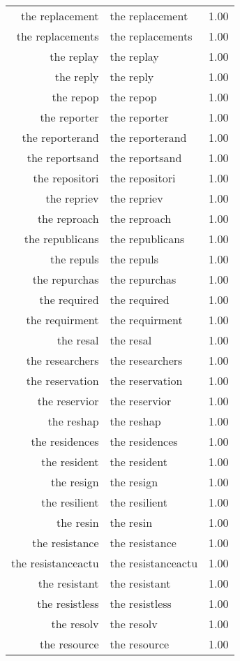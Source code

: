 \begin{table}[ht]
\begin{tabular}{rlr}
  the replacement & the replacement & 1.00 \\ 
  the replacements & the replacements & 1.00 \\ 
  the replay & the replay & 1.00 \\ 
  the reply & the reply & 1.00 \\ 
  the repop & the repop & 1.00 \\ 
  the reporter & the reporter & 1.00 \\ 
  the reporterand & the reporterand & 1.00 \\ 
  the reportsand & the reportsand & 1.00 \\ 
  the repositori & the repositori & 1.00 \\ 
  the repriev & the repriev & 1.00 \\ 
  the reproach & the reproach & 1.00 \\ 
  the republicans & the republicans & 1.00 \\ 
  the repuls & the repuls & 1.00 \\ 
  the repurchas & the repurchas & 1.00 \\ 
  the required & the required & 1.00 \\ 
  the requirment & the requirment & 1.00 \\ 
  the resal & the resal & 1.00 \\ 
  the researchers & the researchers & 1.00 \\ 
  the reservation & the reservation & 1.00 \\ 
  the reservior & the reservior & 1.00 \\ 
  the reshap & the reshap & 1.00 \\ 
  the residences & the residences & 1.00 \\ 
  the resident & the resident & 1.00 \\ 
  the resign & the resign & 1.00 \\ 
  the resilient & the resilient & 1.00 \\ 
  the resin & the resin & 1.00 \\ 
  the resistance & the resistance & 1.00 \\ 
  the resistanceactu & the resistanceactu & 1.00 \\ 
  the resistant & the resistant & 1.00 \\ 
  the resistless & the resistless & 1.00 \\ 
  the resolv & the resolv & 1.00 \\ 
  the resource & the resource & 1.00 \\ 

\end{tabular}
\end{table}
